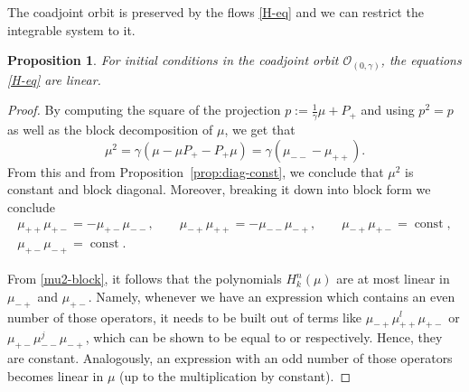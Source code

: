 \documentclass[10pt,a4paper]{amsart}
\newtheorem{prop}[thm]{Proposition}
\theoremstyle{definition}
\numberwithin{equation}{section}
\DeclareMathOperator{\const}{const}
\newcommand{\be}{\begin{equation}}
\newcommand{\ee}{\end{equation}}
\begin{document}
The coadjoint orbit is preserved by the flows \eqref{H-eq} and we can restrict the integrable system to it.
\begin{prop}\label{prop:mu-linear}
For initial conditions in the coadjoint orbit $\mathcal O_{(0,\gamma)}$, the equations \eqref{H-eq} are linear.
\end{prop}
\begin{proof}
By computing the square of the projection $p:= \frac{1}{\gamma}\mu + P_+$ and using $p^2 = p$ as well as the block decomposition of $\mu$, we get that
\be \label{mu2} \mu^2 = \gamma (\mu-\mu P_+ - P_+\mu) = \gamma(\mu_{--}-\mu_{++}).\ee
From this and from Proposition~\ref{prop:diag-const}, we conclude that $\mu^2$ is constant and block diagonal. Moreover, breaking it down into block form we conclude
\begin{gather}\label{mu2-block}
\mu_{++} \mu_{+-} = - \mu_{+-}\mu_{--},\qquad
\mu_{-+} \mu_{++} = - \mu_{--}\mu_{-+},\qquad
\mu_{-+}\mu_{+-} = \const,\nonumber\\
\mu_{+-}\mu_{-+} = \const.
\end{gather}

From \eqref{mu2-block}, it follows that the polynomials $H^n_k(\mu)$ are at most linear in $\mu_{-+}$ and $\mu_{+-}$. Namely, whenever we have an expression which contains an even number of those operators, it needs to be built out of terms like $\mu_{-+}\mu_{++}^l\mu_{+-}$ or $\mu_{+-}\mu_{--}^j\mu_{-+}$, which can be shown to be equal to  or  respectively. Hence, they are constant. Analogously, an expression with an odd number of those operators becomes linear in $\mu$ (up to the multiplication by constant).
\end{proof}
\end{document}
